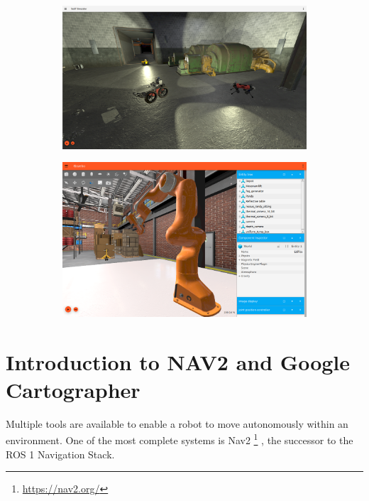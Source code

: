 	\begin{figure}[h]
		\centering
		\begin{subfigure}{0.4\textwidth}
			\centering
			\includegraphics[width=1\linewidth]{img/gazebo1.png}
		\end{subfigure}
		\begin{subfigure}{0.4\textwidth}
			\centering
			\includegraphics[width=1\linewidth]{img/gazebo2.png}
		\end{subfigure}
\end{figure}
\chapter{Introduction to NAV2 and Google Cartographer}
Multiple tools are available to enable a robot to move autonomously within an environment. One of the most complete systems is Nav2 
\footnote{\href{https://nav2.org/}{https://nav2.org/}}
\cite{macenski2020marathon2}, the successor to the ROS 1 Navigation Stack.
